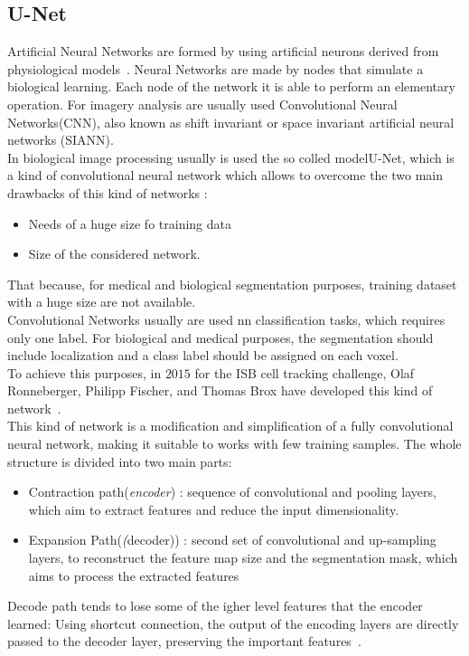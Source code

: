 \documentclass{standalone}
\begin{document}
		\subsection{U-Net}
		
		Artificial Neural Networks are formed by using artificial neurons derived from physiological models~\cite{INP:Withey}. Neural Networks are made by nodes that simulate a biological learning. Each node of the network it is able to perform an elementary operation.  For imagery analysis are usually used Convolutional Neural Networks(CNN), also known as shift invariant or space invariant artificial neural networks (SIANN).\\
			
		In biological image processing usually is used the  so colled modelU-Net, which is a kind of convolutional neural network which allows to overcome the two main drawbacks of this kind of networks :
		\begin{itemize}
			\item Needs of a huge size fo training data
			\item Size of the considered network. 
		\end{itemize}
	
		That because, for medical and biological segmentation purposes, training dataset with a huge size are not available.\\
		Convolutional Networks usually are used nn classification tasks, which requires only one label. For biological and medical purposes, the segmentation 	should include localization and a class label should be assigned on each voxel.\\
		To achieve this purposes, in $2015$ for the ISB cell tracking challenge, Olaf Ronneberger, Philipp Fischer, and Thomas Brox have developed this kind of network~\cite{ART:Johannes}. \\
		This kind of network is a modification and simplification of a fully convolutional neural network, making it suitable to works with few training samples.
		The whole structure is divided into two main parts:
		\begin{itemize}
			\item Contraction path(\textit{encoder}) : sequence of convolutional and pooling layers, which aim
			to extract features and reduce the input dimensionality. 
			
			\item Expansion Path(\textit(decoder)) : second set of convolutional and up-sampling layers, to reconstruct the
			feature map size and the segmentation mask, which aims to process the extracted features
		\end{itemize}
		Decode path tends to lose some of the igher level features that the encoder learned: Using shortcut connection, the output of the encoding layers are directly passed to the decoder layer, preserving the important features~\cite{PhDtheis}.\\
	
\end{document}
